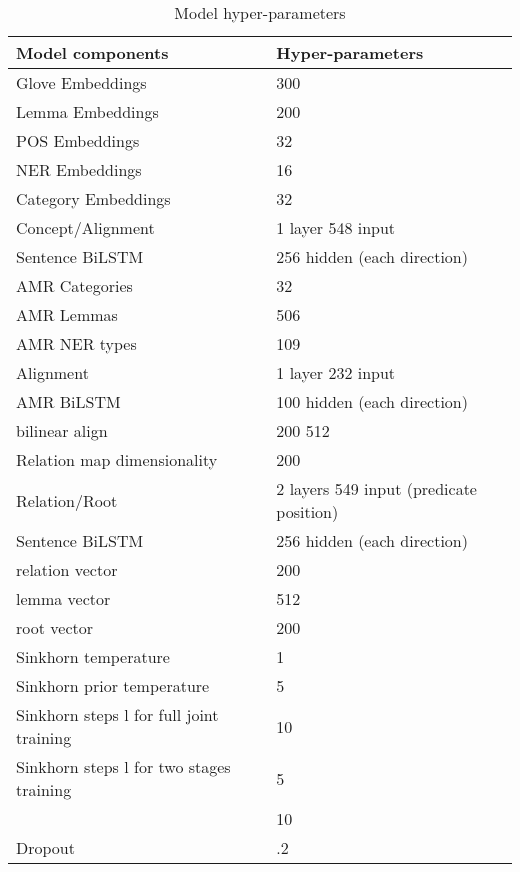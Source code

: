 \documentclass[11pt,a4paper]{article}
\begin{document}
\begin{table}[t!]\small
    \begin{center} 
        \begin{tabular}{ll} 
            \hline  Model components &  Hyper-parameters \\  \hline
          Glove Embeddings & 300\\
            Lemma Embeddings & 200\\
            POS Embeddings & 32\\
            NER Embeddings & 16\\
            Category Embeddings & 32\\ \hline 
           Concept/Alignment & 1 layer 548 input \\
          Sentence BiLSTM & 256 hidden (each direction)\\ \hline 
            AMR Categories & 32\\
            AMR Lemmas   & 506\\
           AMR NER types & 109\\ \hline 
           Alignment   & 1 layer 232 input \\
           AMR BiLSTM  & 100 hidden (each direction)\\ \hline 
             bilinear align  & 200  512\\ \hline 
            Relation map dimensionality   & 200 \\ \hline 
           Relation/Root &2  layers 549 input \tiny(predicate position)  \\
            Sentence BiLSTM&  256 hidden (each direction)\\ \hline 
             relation vector& 200\\
            lemma vector & 512\\
            root vector & 200\\
           \hline
           Sinkhorn temperature & 1 \\
           Sinkhorn prior temperature & 5 \\
Sinkhorn steps l for full joint training & 10 \\
Sinkhorn steps l for two stages training & 5 \\
           & 10 \\
 Dropout & .2 \\
            \hline
        \end{tabular}
    \end{center}
	\caption{\label{table:parameter} Model hyper-parameters}
\end{table}
\end{document}
